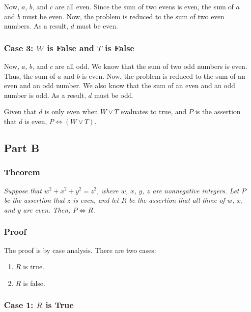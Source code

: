 \documentclass{article}
\begin{document}
Now, $a$, $b$, and $c$ are all even. Since the sum of two evens is even, the sum
of $a$ and $b$ must be even. Now, the problem is reduced to the sum of two even
numbers. As a result, $d$ must be even.

\subsubsection*{Case 3: $W$ is False and $T$ is False}

Now, $a$, $b$, and $c$ are all odd. We know that the sum of two odd numbers is
even. Thus, the sum of $a$ and $b$ is even. Now, the problem is reduced to the
sum of an even and an odd number. We also know that the sum of an even and an
odd number is odd. As a result, $d$ must be odd.

\bigbreak

Given that $d$ is only even when $W \lor T$ evaluates to true, and $P$ is the
assertion that $d$ is even, $ P \iff (W \lor T) $.

\subsection*{Part B}

\subsubsection*{Theorem}

\textit{Suppose that $w^{2} + x^{2} + y^{2} = z^{2}$, where $w$, $x$, $y$, $z$
are nonnegative integers. Let $P$ be the assertion that $z$ is even, and let $R$
be the assertion that all three of $w$, $x$, and $y$ are even. Then, $P \iff R$.}

\subsubsection*{Proof}

The proof is by case analysis. There are two cases:

\begin{enumerate}[\hspace{1cm}1.]
  \item $R$ is true.
  \item $R$ is false.
\end{enumerate}

\subsubsection*{Case 1: $R$ is True}
\end{document}

